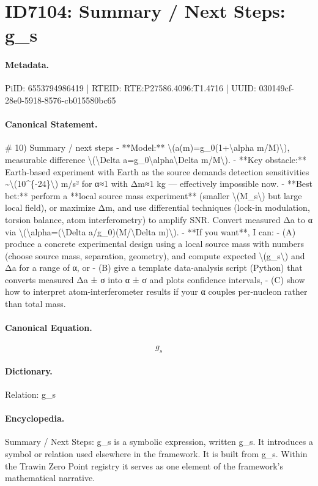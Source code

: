 \section*{ID7104: Summary / Next Steps: g\_s}
\paragraph{Metadata.}
PiID: 6553794986419 | RTEID: RTE:P27586.4096:T1.4716 | UUID: 030149cf-28e0-5918-8576-cb015580bc65

\paragraph{Canonical Statement.}
\# 10) Summary / next steps - **Model:** \textbackslash{}(a(m)=g\_0(1+\textbackslash{}alpha m/M)\textbackslash{}), measurable difference \textbackslash{}(\textbackslash{}Delta a=g\_0\textbackslash{}alpha\textbackslash{}Delta m/M\textbackslash{}). - **Key obstacle:** Earth-based experiment with Earth as the source demands detection sensitivities \textasciitilde{}\textbackslash{}(10\textasciicircum{}\{-24\}\textbackslash{}) m/s² for α≈1 with Δm≈1 kg — effectively impossible now. - **Best bet:** perform a **local source mass experiment** (smaller \textbackslash{}(M\_s\textbackslash{}) but large local field), or maximize Δm, and use differential techniques (lock-in modulation, torsion balance, atom interferometry) to amplify SNR. Convert measured Δa to α via \textbackslash{}(\textbackslash{}alpha=(\textbackslash{}Delta a/g\_0)(M/\textbackslash{}Delta m)\textbackslash{}). - **If you want**, I can: - (A) produce a concrete experimental design using a local source mass with numbers (choose source mass, separation, geometry), and compute expected \textbackslash{}(g\_s\textbackslash{}) and Δa for a range of α, or - (B) give a template data-analysis script (Python) that converts measured Δa ± σ into α ± σ and plots confidence intervals, - (C) show how to interpret atom-interferometer results if your α couples per-nucleon rather than total mass.

\paragraph{Canonical Equation.}
\[
g_s
\]

\paragraph{Dictionary.}
Relation: g\_s

\paragraph{Encyclopedia.}
Summary / Next Steps: g\_s is a symbolic expression, written g\_s. It introduces a symbol or relation used elsewhere in the framework. It is built from g\_s. Within the Trawin Zero Point registry it serves as one element of the framework's mathematical narrative.

